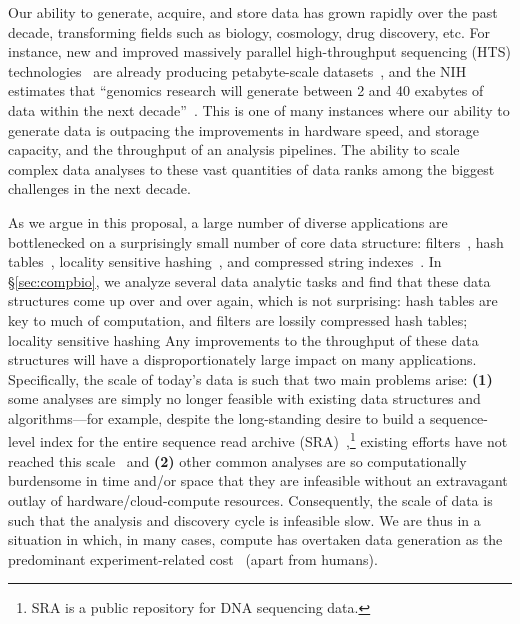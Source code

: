 Our ability to generate, acquire, and store data has grown rapidly over
the past decade, transforming fields such as biology, cosmology, drug
discovery, etc.   
For
instance, new and improved
massively parallel high-throughput sequencing (HTS) technologies~\cite{reuter2015high} are already producing petabyte-scale
datasets~\cite{kodama2012sequence}, and the NIH estimates that ``genomics
research will generate between 2 and 40 exabytes of data within the next
decade''~\cite{NHGRIDataScience}.
This is one of many instances where our
ability to generate data is outpacing the improvements in hardware speed, and
storage capacity, and the throughput of an analysis pipelines.
The ability to scale complex data analyses to these vast quantities of data ranks among the biggest challenges in the next decade.

As we argue in this proposal, a large number of diverse applications are bottlenecked on a surprisingly small number of core data structure: filters~\cite{PandeyAlBe18, solomon2016fast},
hash tables~\cite{solomon2016fast,almodaresi2022incrementally}, locality
sensitive hashing~\cite{Marais2019}, and compressed string
indexes~\cite{Almodaresi2018Pufferfish}. 
In \S\ref{sec:compbio}, we analyze several data analytic tasks and find that these data structures come up over and over again, which is not surprising: hash tables are key to much of computation, and filters are lossily compressed hash tables; locality sensitive hashing 
Any improvements to the throughput of these data structures will have a disproportionately large impact on many applications. 
Specifically, the scale of today's data is
such that two main problems arise: \textbf{(1)} some analyses are simply
no longer feasible with existing data structures and algorithms---for example,
despite the long-standing desire to build a sequence-level index for the entire
sequence read archive (SRA)~\cite{SRA},\footnote{SRA is a public repository for DNA sequencing data.} existing efforts have not reached this
scale~\cite{Karasikov2020, HarrisM20, SolomonK17, almodaresi2022incrementally,
AlmodaresiPFJP20,PandeyAlBe18} and \textbf{(2)} other common analyses are so computationally burdensome in time and/or space that they are infeasible without an extravagant outlay of hardware/cloud-compute resources.
Consequently, the scale of data is such that the analysis and discovery cycle is infeasible slow.  We are thus in a situation in
which, in many cases, compute has overtaken data generation as the predominant
experiment-related cost~\cite{Muir_2016} (apart from humans).

